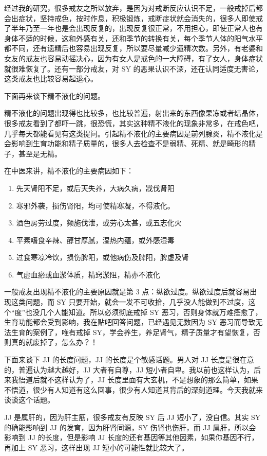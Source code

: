 \documentclass[fontset=founder]{ctexart}
\begin{document}
经过我的研究，很多戒友之所以放弃，是因为对戒断反应认识不足，一般戒掉后都会出症状，坚持戒色，按时作息，积极锻炼，戒断症状就会消失的，很多人即使戒了半年乃至一年也是会出现反复的，出现反复很正常，不用担心，即使正常人也有身体不适的时候，这和外感有关，还和季节的转换有关，每个季节人体的阳气水平都不同，还有遗精后也容易出现反复，所以要尽量减少遗精次数。另外，有老婆和女友的戒友也容易动摇决心，因为有女人是戒色的一大障碍，有了女人，身体症状就很难恢复了。还有一部分戒友，对 SY 的恶果认识不深，还在认同适度无害论，这类戒友也比较容易起退心。

下面再来谈下精不液化的问题。

精不液化的问题出现得也比较多，也比较普遍，射出来的东西像果冻或者结晶体，很多戒友看到了都吓一跳，很恐慌，其实这种精不液化的现象非常多，在戒色吧，几乎每天都能看见有这类提问。引起精不液化的主要病因是前列腺炎，精不液化是会影响到生育功能和精子质量的，很多人去检查不是弱精、死精、就是畸形的精子，甚至是无精。

在中医来讲，精不液化的主要病因如下：

\begin{enumerate}
    \item 先天肾阳不足，或后天失养，大病久病，戕伐肾阳
    \item 寒邪外袭，损伤肾阳，均可使精寒凝，不得液化。
    \item 酒色房劳过度，频施伐泄，或劳心太甚，或五志化火
    \item 平素嗜食辛辣、醇甘厚腻，湿热内蕴，或外感湿毒
    \item 过食寒凉冷饮，损伤脾阳，或他病伤及脾阳，脾虚及肾
    \item 气虚血瘀或血淤体质，精窍淤阻，精亦不液化
\end{enumerate}

一般戒友出现精不液化的主要原因就是第 3 点：纵欲过度。纵欲过度后就容易出现这类问题，而 SY 只要开始，就会一发不可收拾，几乎没人能做到不过度，这个“度”也没几个人能知道。所以必须彻底戒掉 SY 恶习，否则身体就万难痊愈了，生育功能都会受到影响，我在贴吧回答问题，已经遇见无数因为 SY 恶习而导致无法生育的案例了，唯有戒掉 SY，学会养生，养足肾气，精子质量才有望恢复，否则真的就废掉了，怎么办？！

下面来谈下 JJ 的长度问题，JJ 的长度是个敏感话题。男人对 JJ 长度是很在意的，普遍认为越大越好，JJ 大者有自尊，JJ 短小者自卑。我以前也这样认为，后来我悟道后就不这样认为了，JJ 长度里面有大玄机，不是想象的那么简单，如果不悟道，很少有人知道有这么回事，很少有人知道其背后的深刻道理。今天我就来谈谈这个话题。

JJ 是属肝的，因为肝主筋，很多戒友有反映 SY 后 JJ 短小了，没自信。其实 SY 的确能影响到 JJ 的发育，因为肝肾同源，SY 伤肾也伤肝，而 JJ 属肝，所以会影响到 JJ 的长度，但是影响 JJ 长度的还有基因等其他因素，如果你基因不行，再加上 SY 恶习，这样出现 JJ 短小的可能性就比较大了。
\end{document}
